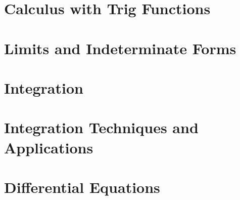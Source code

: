 \documentclass[letterpaper]{memoir}
\newcommand{\chapterthree}{Calculus with Trig Functions}
\newcommand{\chapterfour}{Limits and Indeterminate Forms}
\newcommand{\chapterfive}{Integration}
\newcommand{\chaptersix}{Integration Techniques and Applications}
\newcommand{\chapterseven}{Differential Equations}
\begin{document}
\chapter{\chapterthree}
\clearpage













\chapter{\chapterfour}
\clearpage







\chapter{\chapterfive}
\clearpage















\chapter{\chaptersix}
\clearpage















\chapter{\chapterseven}
\clearpage




\end{document}
